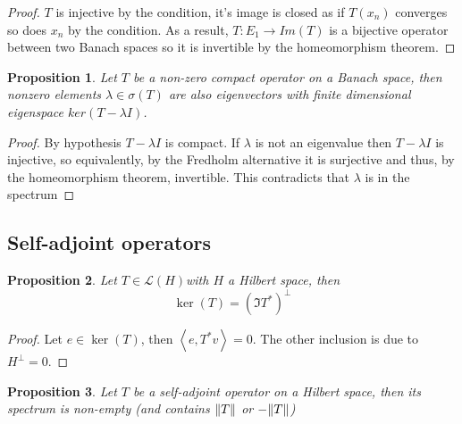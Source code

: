 \documentclass[12pt]{article}
\newtheorem{proposition}{Proposition}
\newcommand{\br}[1]{\left\langle#1\right\rangle}
\begin{document}
\begin{proof}
    $T$ is injective by the condition, it's image is closed as if $T(x_n)$ converges so does $x_n$ by the condition. As a result, $T:E_1\to Im(T)$ is a bijective operator between two Banach spaces so it is invertible by the homeomorphism theorem.
\end{proof}
\begin{proposition}
    Let $T$ be a non-zero compact operator on a Banach space, then nonzero elements $\lambda\in\sigma(T)$ are also eigenvectors with finite dimensional eigenspace $ker(T-\lambda I)$.
\end{proposition}
\begin{proof}
    By hypothesis $T-\lambda I$ is compact. If $\lambda$ is not an eigenvalue then $T-\lambda I$ is injective, so equivalently, by the Fredholm alternative it is surjective and thus, by the homeomorphism theorem, invertible. This contradicts that $\lambda$ is in the spectrum
\end{proof}
\subsection{Self-adjoint operators}
\begin{proposition}
    Let $T\in\mathcal{L}(H)$with $H$ a Hilbert space, then
    \begin{equation*}
        \ker(T)=(\Im T^*)^\perp
    \end{equation*}
\end{proposition}
\begin{proof}
    Let $e\in \ker(T)$, then $\br{e,T^*v}=0$. The other inclusion is due to $H^\perp =0$.
\end{proof}
\begin{proposition}
    Let $T$ be a self-adjoint operator on a Hilbert space, then its spectrum is non-empty (and contains $\norm{T}$ or $-\norm{T}$)
\end{proposition}
\end{document}
